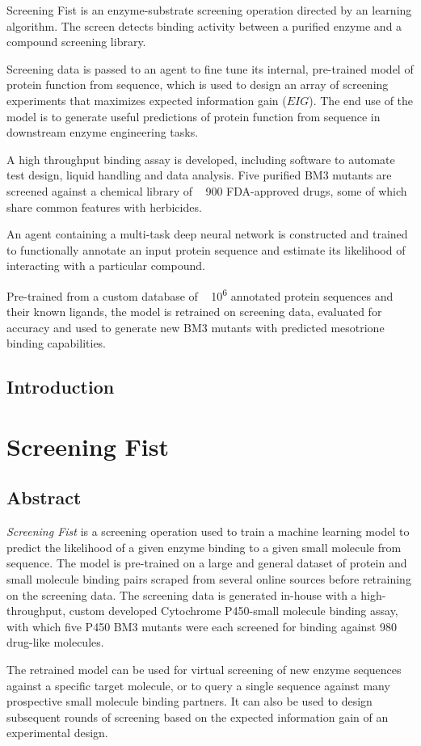 \documentclass[16pt]{book}
\begin{document}
Screening Fist is an enzyme-substrate screening operation directed by an learning algorithm.
The screen detects binding activity between a purified enzyme and a compound screening library.

Screening data is passed to an agent to fine tune its internal, pre-trained model of protein function from sequence, which is used to design an array of screening experiments that maximizes expected information gain ($EIG$).
The end use of the model is to generate useful predictions of protein function from sequence in downstream enzyme engineering tasks.

A high throughput binding assay is developed, including software to automate test design, liquid handling and data analysis.
Five purified BM3 mutants are screened against a chemical library of ~ 900 FDA-approved drugs, some of which share common features with herbicides.

An agent containing a multi-task deep neural network is constructed and trained to functionally annotate an input protein sequence and estimate its likelihood of interacting with a particular compound.

Pre-trained from a custom database of ~ 10\textsuperscript{6} annotated protein sequences and their known ligands, the model is retrained on screening data, evaluated for accuracy and used to generate new BM3 mutants with predicted mesotrione binding capabilities.

\section{Introduction}
\cite{hawkes2007ep}

\chapter{Screening Fist}
\section{Abstract}
\textit{Screening Fist} is a screening operation used to train a machine learning model to predict the likelihood of a given enzyme binding to a given small molecule from sequence.
The model is pre-trained on a large and general dataset of protein and small molecule binding pairs scraped from several online sources before retraining on the screening data.
The screening data is generated in-house with a high-throughput, custom developed Cytochrome P450-small molecule binding assay, with which five P450 BM3 mutants were each screened for binding against 980 drug-like molecules.
\par
The retrained model can be used for virtual screening of new enzyme sequences against a specific target molecule, or to query a single sequence against many prospective small molecule binding partners.
It can also be used to design subsequent rounds of screening based on the expected information gain of an experimental design.
\end{document}
